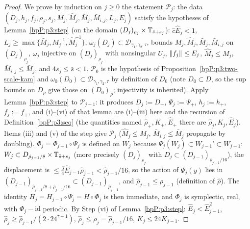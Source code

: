 \begin{proof}
\label{stepP:p3:it-ind}
We prove by induction on $j\ge0$ the statement $\mathcal P_j$: the data $(D_j,h_j,f_j,\rho_j,s_j,M_j,\hat M_j,\bar M_j,\bar M_{i,j},L_j,E_j)$ satisfy the hypotheses of Lemma~\ref{bpP:p3:step} (on the domain $(D_j)_{\rho_j}\times\mathbb{T}_{\bar s+s_j}$): $\hat c\hat E_j<1$, $L_j\ge\max\{\bar M_j,M_j^{-1},\hat M_j^{-1}\}$, $\omega_j(D_j)\subset\mathcal D_{\gamma_1,\gamma_2,\tau}$, bounds $M_j,\hat M_j,\bar M_j,\bar M_{i,j}$ on $(D_j)_{\rho_j}$, $\omega_j$ injective on $(D_j)_{\rho_j}$ with nonsingular $U_j$, $\lVert f_j\rVert\le E_j$, $\hat M_j\le M_j$, $\bar M_{i,j}\le\bar M_j$, and $4s_j\le\bar s<1$.
\label{stepP:p3:it-base}
$\mathcal P_0$ is the hypothesis of Proposition~\ref{bpP:p3:two-scale-kam} and $\omega_0(D_0)\subset\mathcal D_{\gamma_1,\gamma_2,\tau}$ by definition of $D_0$ (note $D_0\subset D$, so the sup bounds on $D_\rho$ give those on $(D_0)_\rho$; injectivity is inherited).
\label{stepP:p3:it-step}
Apply Lemma~\ref{bpP:p3:step} to $\mathcal P_{j-1}$: it produces $D_j:=D_+$, $\Psi_j:=\Psi_+$, $h_j:=h_+$, $f_j:=f_+$, and (i)--(vi) of that lemma are (i)--(iii) here and the recursion of Definition~\ref{bpP:p3:seq} (the quantities named $\hat\rho_+,K_+,\hat E_+$ there are $\hat\rho_j,K_j,\hat E_j$). Items (iii) and (v) of the step give $\mathcal P_j$ ($\hat M_j\le M_j$, $\bar M_{i,j}\le\bar M_j$ propagate by doubling).
\label{stepP:p3:it-comp}
$\Phi_j=\Phi_{j-1}\circ\Psi_j$ is defined on $W_j$ because $\Psi_j(W_j)\subset W_{j-1}'\subset W_{j-1}$: $W_j\subset D_{\hat\rho_{j-1}/8}\times\mathbb{T}_{\bar s+s_j}$ (more precisely $(D_j)_{\rho_j}$ with $D_j\subset(D_{j-1})_{\hat\rho_{j-1}/16}$), the displacement is $\le\frac34\hat E_{j-1}\hat\rho_{j-1}<\hat\rho_{j-1}/16$, so the action of $\Psi_j(y)$ lies in $(D_{j-1})_{\hat\rho_{j-1}/8+\hat\rho_{j-1}/16}\subset(D_{j-1})_{\hat\rho_{j-1}}$, and $\hat\rho_{j-1}\le\rho_{j-1}$ (definition of $\hat\rho$). The identity $H_j=H_{j-1}\circ\Psi_j=H\circ\Phi_j$ is then immediate, and $\Phi_j$ is symplectic, real, with $\Phi_j-\mathrm{id}$ periodic.
\label{stepP:p3:it-rates}
By Step (vi) of Lemma~\ref{bpP:p3:step}: $\hat E_j<\hat E_{j-1}^2$, $\hat\rho_j\ge\hat\rho_{j-1}/(2\cdot24^{\tau+1})$, $\hat\rho_j\le\rho_j=\hat\rho_{j-1}/16$, $K_j\le24K_{j-1}$.
\end{proof}
